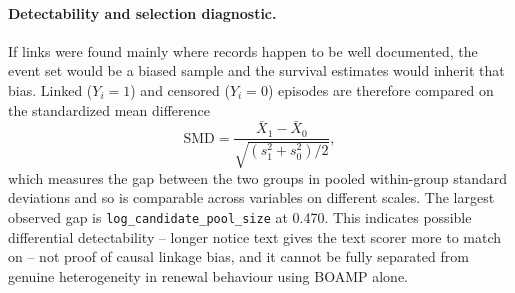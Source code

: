 \documentclass[11pt,a4paper]{article}
\newcommand{\code}[1]{\texttt{#1}}
\begin{document}
\paragraph{Detectability and selection diagnostic.} If links were found mainly
where records happen to be well documented, the event set would be a biased
sample and the survival estimates would inherit that bias. Linked
(\(Y_i=1\)) and censored (\(Y_i=0\)) episodes are therefore compared on the
standardized mean difference
\[
\mathrm{SMD}=\frac{\bar{X}_1-\bar{X}_0}{\sqrt{(s_1^2+s_0^2)/2}},
\]
which measures the gap between the two groups in pooled within-group standard
deviations and so is comparable across variables on different scales. The
largest observed gap is
\code{log\_candidate\_pool\_size}
at 0.470.
This indicates possible differential detectability -- longer notice text gives
the text scorer more to match on -- not proof of causal linkage bias, and it
cannot be fully separated from genuine heterogeneity in renewal behaviour using
BOAMP alone.
\end{document}
